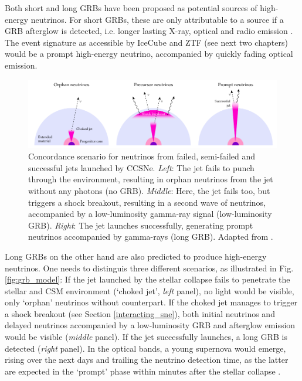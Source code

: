 \documentclass[
    a4paper, %
    fontsize=10pt, %
    twoside=false, %
    numbers=noenddot, %
    fontmethod=tex,
]{kaobook}
\begin{document}
Both short and long GRBs have been proposed as potential sources of high-energy neutrinos. For short GRBs, these are only attributable to a source if a GRB afterglow is detected, i.e. longer lasting X-ray, optical and radio emission . The event signature as accessible by IceCube and ZTF (see next two chapters) would be a prompt high-energy neutrino, accompanied by quickly fading optical emission.

\begin{figure}[htb]
    \includegraphics[width=1\textwidth]{theory/grb_model.pdf}
    \caption[High-energy neutrinos from GRBs]{Concordance scenario for neutrinos from failed, semi-failed and successful jets launched by CCSNe. \textit{Left}: The jet fails to punch through the environment, resulting in orphan neutrinos from the jet without any photons (no GRB). \textit{Middle}: Here, the jet fails too, but triggers a shock breakout, resulting in a second wave of neutrinos, accompanied by a low-luminosity gamma-ray signal (low-luminosity GRB). \textit{Right}: The jet launches successfully, generating prompt neutrinos accompanied by gamma-rays (long GRB). Adapted from \cite{Senno2016}.}
\end{figure}

Long GRBs on the other hand are also predicted to produce high-energy neutrinos. One needs to distinguis three different scenarios, as illustrated in Fig. \ref{fig:grb_model}: If the jet launched by the stellar collapse fails to penetrate the stellar and CSM environment (`choked jet', \textit{left} panel), no light would be visible, only `orphan' neutrinos without counterpart. If the choked jet manages to trigger a shock breakout (see Section \ref{interacting_sne}), both initial neutrinos and delayed neutrinos accompanied by a low-luminosity GRB and afterglow emission would be visible (\textit{middle} panel). If the jet successfully launches, a long GRB is detected (\textit{right} panel). In the optical bands, a young supernova would emerge, rising over the next days and trailing the neutrino detection time, as the latter are expected in the `prompt' phase within minutes after the stellar collapse .
\end{document}
